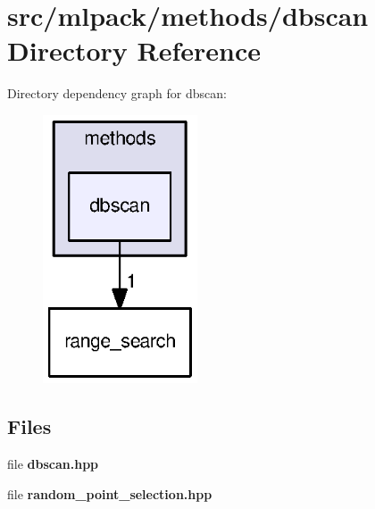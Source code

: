 \section{src/mlpack/methods/dbscan Directory Reference}
\label{dir_9706a54a818a8a8f60d990f75cc3c60c}
Directory dependency graph for dbscan\+:
\nopagebreak
\begin{figure}[H]
\begin{center}
\leavevmode
\includegraphics[width=130pt]{dir_9706a54a818a8a8f60d990f75cc3c60c_dep}
\end{center}
\end{figure}
\subsection*{Files}
\begin{DoxyCompactItemize}
\item 
file {\bf dbscan.\+hpp}
\item 
file {\bf random\+\_\+point\+\_\+selection.\+hpp}
\end{DoxyCompactItemize}
